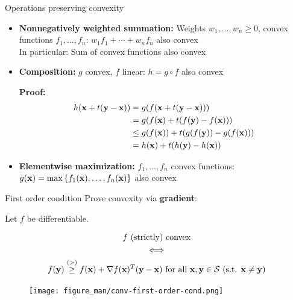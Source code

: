 \documentclass[11pt,compress,t,notes=noshow, xcolor=table]{beamer}
\begin{document}
\begin{vbframe}{Operations preserving convexity}

\begin{itemize}
    \item \textbf{Nonnegatively weighted summation:} Weights $w_1,\ldots,w_n\geq0$, convex functions $f_1,\ldots,f_n$:
        $w_1f_1 + \cdots + w_nf_n$ also convex \\
        In particular: Sum of convex functions also convex
    \item \textbf{Composition:} $g$ convex, $f$ linear: $h = g \circ f$ also convex

        \begin{footnotesize}
            \textbf{Proof:}
            \begin{align*}
                h(\mathbf{x} + t(\mathbf{y}-\mathbf{x})) &= g(f(\mathbf{x} + t(\mathbf{y}-\mathbf{x}))) \\
                &= g(f(\mathbf{x}) + t(f(\mathbf{y}) - f(\mathbf{x}))) \\
                &\leq g(f(\mathbf{x})) + t(g(f(\mathbf{y})) - g(f(\mathbf{x}))) \\
                &= h(\mathbf{x}) + t(h(\mathbf{y}) - h(\mathbf{x}))
            \end{align*}
        \end{footnotesize}
    \item \textbf{Elementwise maximization:} $f_1,\ldots,f_n$ convex functions: $g(\mathbf{x}) = \max\left\lbrace f_1(\mathbf{x}),\ldots,f_n(\mathbf{x}) \right\rbrace$ also convex
\end{itemize}

\end{vbframe}


\begin{vbframe}{First order condition}
Prove convexity via \textbf{gradient}:

\vspace{-0.5\baselineskip}


    Let $f$ be differentiable.

    \vspace{-\baselineskip}

    \begin{gather*}
        \textnormal{$f$ (strictly) convex} \\
        \Longleftrightarrow \\
        f(\mathbf{y}) \overset{(>)}{\geq} f(\mathbf{x}) + \nabla f(\mathbf{x})^T (\mathbf{y}-\mathbf{x}) \textnormal{ for all $\mathbf{x},\mathbf{y}\in\mathcal{S}$ (s.t. $\mathbf{x} \not= \mathbf{y}$)}
    \end{gather*}


\vspace{-0.2cm}

\begin{figure}
    \centering
    \texttt{[image: figure\_man/conv-first-order-cond.png]}
\end{figure}

\end{vbframe}
\end{document}
